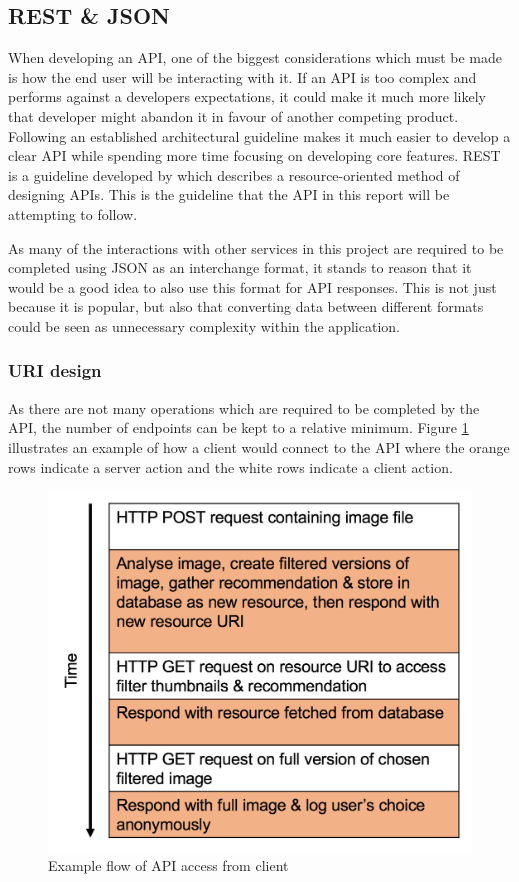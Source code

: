 \documentclass[a4paper,12pt]{report}
\begin{document}
    \subsection{REST \& JSON}
      When developing an API, one of the biggest considerations which must be made is how the end user will be interacting with it. If an API is too complex and performs against a developers expectations, it could make it much more likely that developer might abandon it in favour of another competing product. Following an established architectural guideline makes it much easier to develop a clear API while spending more time focusing on developing core features. REST is a guideline developed by \cite{fielding2000architectural} which describes a resource-oriented method of designing APIs. This is the guideline that the API in this report will be attempting to follow.

      As many of the interactions with other services in this project are required to be completed using JSON as an interchange format, it stands to reason that it would be a good idea to also use this format for API responses. This is not just because it is popular, but also that converting data between different formats could be seen as unnecessary complexity within the application.

      \subsubsection{URI design}
        As there are not many operations which are required to be completed by the API, the number of endpoints can be kept to a relative minimum. Figure \ref{fig:api-call-flow} illustrates an example of how a client would connect to the API where the orange rows indicate a server action and the white rows indicate a client action.

        \begin{figure}[h]
          \centering
          \includegraphics[width=0.5\linewidth]{api-call-flow}
          \caption{Example flow of API access from client}
          \label{fig:api-call-flow}
        \end{figure}
\end{document}
